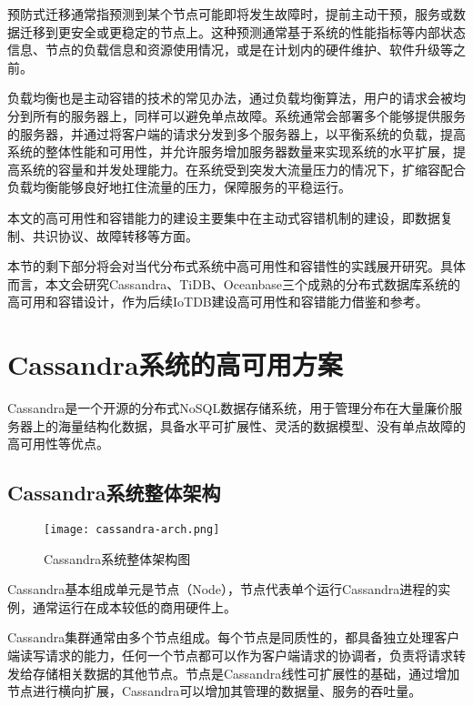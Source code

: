 预防式迁移通常指预测到某个节点可能即将发生故障时，提前主动干预，服务或数据迁移到更安全或更稳定的节点上。这种预测通常基于系统的性能指标等内部状态信息、节点的负载信息和资源使用情况，或是在计划内的硬件维护、软件升级等之前。

负载均衡也是主动容错的技术的常见办法，通过负载均衡算法，用户的请求会被均分到所有的服务器上，同样可以避免单点故障。系统通常会部署多个能够提供服务的服务器，并通过将客户端的请求分发到多个服务器上，以平衡系统的负载，提高系统的整体性能和可用性，并允许服务增加服务器数量来实现系统的水平扩展，提高系统的容量和并发处理能力。在系统受到突发大流量压力的情况下，扩缩容配合负载均衡能够良好地扛住流量的压力，保障服务的平稳运行。



本文的高可用性和容错能力的建设主要集中在主动式容错机制的建设，即数据复制、共识协议、故障转移等方面。

本节的剩下部分将会对当代分布式系统中高可用性和容错性的实践展开研究。具体而言，本文会研究Cassandra、TiDB、Oceanbase三个成熟的分布式数据库系统的高可用和容错设计，作为后续IoTDB建设高可用性和容错能力借鉴和参考。



\section{Cassandra系统的高可用方案}
Cassandra\cite{lakshman2010cassandra}是一个开源的分布式NoSQL数据存储系统，用于管理分布在大量廉价服务器上的海量结构化数据，具备水平可扩展性、灵活的数据模型、没有单点故障的高可用性等优点。

\subsection{Cassandra系统整体架构}

\begin{figure}
  \centering
  \texttt{[image: cassandra-arch.png]}
  \caption{Cassandra系统整体架构图}
  \label{fig:cassandra-arch}
\end{figure}

Cassandra基本组成单元是节点（Node），节点代表单个运行Cassandra进程的实例，通常运行在成本较低的商用硬件上。

Cassandra集群通常由多个节点组成。每个节点是同质性的，都具备独立处理客户端读写请求的能力，任何一个节点都可以作为客户端请求的协调者，负责将请求转发给存储相关数据的其他节点。节点是Cassandra线性可扩展性的基础，通过增加节点进行横向扩展，Cassandra可以增加其管理的数据量、服务的吞吐量。

